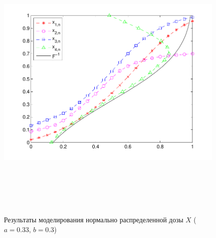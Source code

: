 \documentclass[a4paper,14pt,russian]{article}
\begin{document}
\begin{figure}[h]
\center
\caption{Результаты моделирования нормально распределенной дозы $X$ ($a=0.33$,  $b=0.3$)}\label{Pic2}
\includegraphics[width = 500pt,height = 400pt]{8.pdf}
\end{figure}

\newpage
\end{document}
